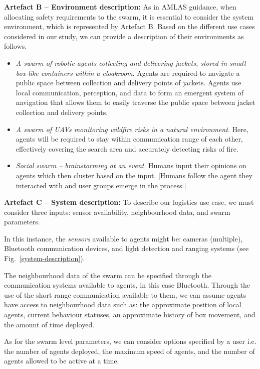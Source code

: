 \documentclass[lettersize,journal]{IEEEtran}
\begin{document}
\noindent \textbf{Artefact B -- Environment description: }
As in AMLAS guidance, when allocating safety requirements to the swarm, it is essential to consider the system environment, which is represented by Artefact B. 
Based on the different use cases considered in our study, we can provide a description of their environments as follows.
\begin{itemize}
	\item \textit{A swarm of robotic agents collecting and delivering jackets, stored in small box-like containers within a cloakroom}. Agents are required to navigate a public space between collection and delivery points of jackets. Agents use local communication, perception, and data to form an emergent system of navigation that allows them to easily traverse the public space between jacket collection and delivery points.
	\item \textit{A swarm of UAVs monitoring wildfire risks in a natural environment}. Here, agents will be required to stay within communication range of each other, effectively covering the search area and accurately detecting risks of fire.
	\item \textit{Social swarm – brainstorming at an event}. Humans input their opinions on agents which then cluster based on the input. [Humans follow the agent they interacted with and user groups emerge in the process.]\\
\end{itemize}

\noindent \textbf{Artefact C -- System description: }
To describe our logistics use case, we must consider three inputs: sensor availability, neighbourhood data, and swarm parameters. 

In this instance, the \textit{sensors} available to agents might be: cameras (multiple), Bluetooth communication devices, and light detection and ranging systems (see Fig.~\ref{system-description}). 

The neighbourhood data of the swarm can be specified through the communication systems available to agents, in this case Bluetooth. Through the use of the short range communication available to them, we can assume agents have access to neighbourhood data such as: the approximate position of local agents, current behaviour statuses, an approximate history of box movement, and the amount of time deployed. 

As for the swarm level parameters, we can consider options specified by a user i.e. the number of agents deployed, the maximum speed of agents, and the number of agents allowed to be active at a time.
\end{document}
